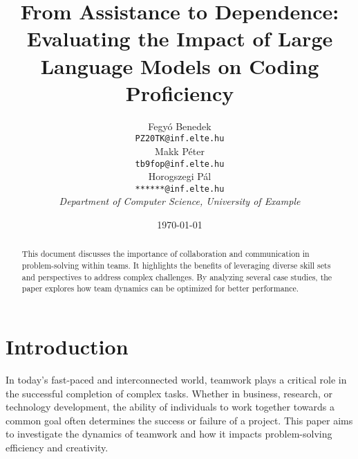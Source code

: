 \documentclass[12pt]{article}  %
\title{From Assistance to Dependence: Evaluating the Impact of Large Language Models on Coding Proficiency}  %
\author{
  Fegyó Benedek\\
  \texttt{PZ20TK@inf.elte.hu} \\[1ex]
  Makk Péter\\
  \texttt{tb9fop@inf.elte.hu} \\[1ex]
  Horogszegi Pál\\
  \texttt{******@inf.elte.hu} \\[2ex]
  \textit{Department of Computer Science, University of Example}  %
}
\date{\today}  %
\begin{document}
\maketitle

\begin{abstract}
    This document discusses the importance of collaboration and communication in problem-solving within teams. It highlights the benefits of leveraging diverse skill sets and perspectives to address complex challenges. By analyzing several case studies, the paper explores how team dynamics can be optimized for better performance.
\end{abstract}

\section{Introduction}
\label{sec:intro}

In today's fast-paced and interconnected world, teamwork plays a critical role in the successful completion of complex tasks. Whether in business, research, or technology development, the ability of individuals to work together towards a common goal often determines the success or failure of a project. This paper aims to investigate the dynamics of teamwork and how it impacts problem-solving efficiency and creativity.
\end{document}
